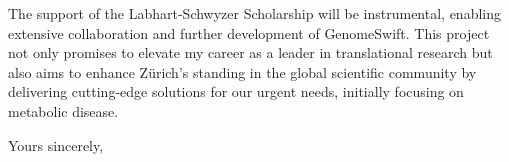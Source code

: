 \documentclass[11pt, a4paper]{letter}
\begin{document}
\begin{letter}{}
The support of the Labhart-Schwyzer Scholarship will be instrumental, enabling extensive collaboration and further development of GenomeSwift. This project not only promises to elevate my career as a leader in translational research but also aims to enhance Zürich's standing in the global scientific community by delivering cutting-edge solutions for our urgent needs, initially focusing on metabolic disease.

\closing{Yours sincerely,}

\ifodd\value{page}
    \newpage
    \thispagestyle{empty}  %
    \mbox{}                %
    \newpage
\fi
\end{letter}
\end{document}
